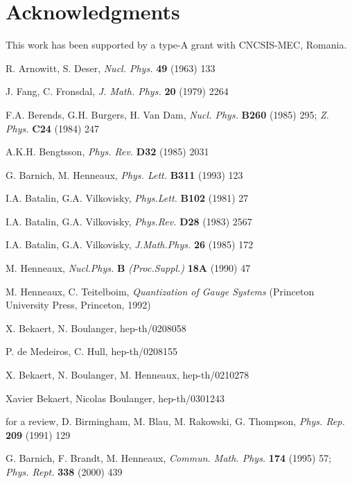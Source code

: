 \documentclass[a4paper,11pt]{article}
\begin{document}
\section*{Acknowledgments}

This work has been supported by a type-A grant with CNCSIS-MEC, Romania.

\begin{thebibliography}{99}
  R. Arnowitt, S. Deser, \textit{Nucl. Phys.} \textbf{49}
(1963) 133

  J. Fang, C. Fronsdal, \textit{J. Math. Phys.} \textbf{20}
(1979) 2264

  F.A. Berends, G.H. Burgers, H. Van Dam, \textit{Nucl. Phys.}
\textbf{B260} (1985) 295; \textit{Z. Phys.} \textbf{C24} (1984) 247

  A.K.H. Bengtsson, \textit{Phys. Rev.} \textbf{D32} (1985)
2031

  G. Barnich, M. Henneaux, \textit{Phys. Lett.} \textbf{B311}
(1993) 123

  I.A. Batalin, G.A. Vilkovisky, \textit{Phys.Lett.} \textbf{B102}
(1981) 27

  I.A. Batalin, G.A. Vilkovisky, \textit{Phys.Rev.} \textbf{D28}
(1983) 2567

  I.A. Batalin, G.A. Vilkovisky, \textit{J.Math.Phys.} \textbf{26}
(1985) 172

  M. Henneaux, \textit{Nucl.Phys.} \textbf{B } \textit{%
(Proc.Suppl.)} \textbf{18A} (1990) 47

  M. Henneaux, C. Teitelboim, \textit{Quantization of Gauge
Systems} (Princeton University Press, Princeton, 1992)

  X. Bekaert, N. Boulanger, hep-th/0208058

  P. de Medeiros, C. Hull, hep-th/0208155

  X. Bekaert, N. Boulanger, M. Henneaux, hep-th/0210278

  Xavier Bekaert, Nicolas Boulanger, hep-th/0301243

  for a review, D. Birmingham, M. Blau, M. Rakowski, G.
Thompson, \textit{Phys. Rep.} \textbf{209} (1991) 129

  G. Barnich, F. Brandt, M. Henneaux, \textit{Commun. Math.
Phys.} \textbf{174} (1995) 57; \textit{Phys. Rept.} \textbf{338} (2000) 439
\end{thebibliography}
\end{document}
